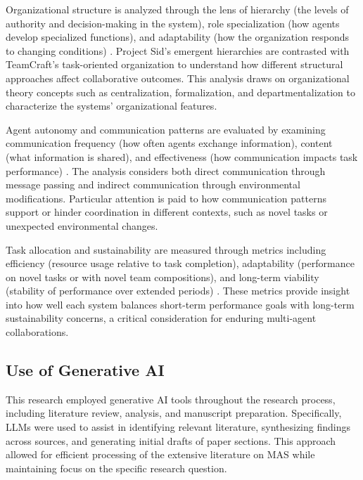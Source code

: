 \documentclass[a4paper, 12pt]{article}
\begin{document}
Organizational structure is analyzed through the lens of hierarchy (the levels of authority and decision-making in the system), role specialization (how agents develop specialized functions), and adaptability (how the organization responds to changing conditions) \autocite{Lhaksmana2018RoleBasedMF,chen2024sagentsselforganizingagentsopenended}. Project Sid's emergent hierarchies are contrasted with TeamCraft's task-oriented organization to understand how different structural approaches affect collaborative outcomes. This analysis draws on organizational theory concepts such as centralization, formalization, and departmentalization to characterize the systems' organizational features.

Agent autonomy and communication patterns are evaluated by examining communication frequency (how often agents exchange information), content (what information is shared), and effectiveness (how communication impacts task performance) \autocite{shu2024effectivegenaimultiagentcollaboration,qiu2024collaborativeintelligencepropagatingintentions}. The analysis considers both direct communication through message passing and indirect communication through environmental modifications. Particular attention is paid to how communication patterns support or hinder coordination in different contexts, such as novel tasks or unexpected environmental changes.

Task allocation and sustainability are measured through metrics including efficiency (resource usage relative to task completion), adaptability (performance on novel tasks or with novel team compositions), and long-term viability (stability of performance over extended periods) \autocite{shu2024effectivegenaimultiagentcollaboration,chen2024sagentsselforganizingagentsopenended}. These metrics provide insight into how well each system balances short-term performance goals with long-term sustainability concerns, a critical consideration for enduring multi-agent collaborations.

\subsection{Use of Generative AI}

This research employed generative AI tools throughout the research process, including literature review, analysis, and manuscript preparation. Specifically, LLMs were used to assist in identifying relevant literature, synthesizing findings across sources, and generating initial drafts of paper sections. This approach allowed for efficient processing of the extensive literature on MAS while maintaining focus on the specific research question.
\end{document}
